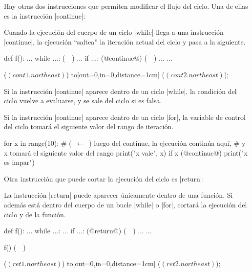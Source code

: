 Hay otras dos instrucciones que permiten modificar el flujo del ciclo. Una de
ellas es la instrucción |continue|:

\begin{observacion}
Cuando la ejecución del cuerpo de un ciclo |while| llega a una
instrucción |continue|, la ejecución ``saltea'' la iteración actual del ciclo y
pasa a la siguiente.

\begin{codigo-python-sn}
def f():
    ...
    while ...: (~~)
        ...
        if ...:
            (@continue@) (~~)
        ...
    ...
\end{codigo-python-sn}
 
    ($(cont1.north east)$)
    to[out=0,in=0,distance=1cm]
    ($(cont2.north east)$);
\end{observacion}

Si la instrucción |continue| aparece dentro de un ciclo |while|, la condición
del ciclo vuelve a evaluarse, y se sale del ciclo si es falsa.

Si la instrucción |continue| aparece dentro de un ciclo |for|, la variable de
control del ciclo tomará el siguiente valor del rango de iteración.

\begin{codigo-python-sn}
for x in range(10): # (~$\leftarrow$~) luego del continue, la ejecución continúa aquí,
                    # y x tomará el siguiente valor del rango
    print("x vale", x)
    if x %
        (@continue@)
    print("x es impar")
\end{codigo-python-sn}

Otra instrucción que puede cortar la ejecución del ciclo es |return|:

\begin{observacion}
La instrucción |return| puede aparecer únicamente dentro de una función. Si
además está dentro del cuerpo de un bucle |while| o |for|, cortará la ejecución
del ciclo y de la función.

\begin{codigo-python-sn}
def f():
    ...
    while ...:
        ...
        if ...:
            (@return@) (~~)
        ...
    ...

f()
(~~)
\end{codigo-python-sn}
 
    ($(ret1.north east)$)
    to[out=0,in=0,distance=1cm]
    ($(ret2.north east)$);
\end{observacion}

